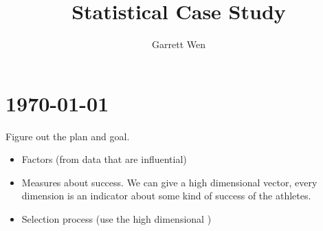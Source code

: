 \documentclass[11pt]{article}
\title{Statistical Case Study}
\author{Garrett Wen}
\begin{document}
\maketitle
\tableofcontents
\section{\today}

Figure out the plan and goal. 


\begin{itemize}
	\item Factors (from data that are influential)
	\item Measures about success.
	We can give a high dimensional vector, every dimension is an indicator about some kind of success of the athletes. 
	\item Selection process (use the high dimensional )
\end{itemize}


\end{document}
